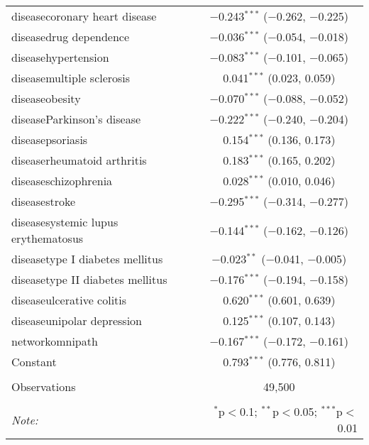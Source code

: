 \begin{table}[!htbp]
\begin{tabular}{@{\extracolsep{5pt}}lc}
  diseasecoronary heart disease & $-$0.243$^{***}$ ($-$0.262, $-$0.225) \\ 
  diseasedrug dependence & $-$0.036$^{***}$ ($-$0.054, $-$0.018) \\ 
  diseasehypertension & $-$0.083$^{***}$ ($-$0.101, $-$0.065) \\ 
  diseasemultiple sclerosis & 0.041$^{***}$ (0.023, 0.059) \\ 
  diseaseobesity & $-$0.070$^{***}$ ($-$0.088, $-$0.052) \\ 
  diseaseParkinson's disease & $-$0.222$^{***}$ ($-$0.240, $-$0.204) \\ 
  diseasepsoriasis & 0.154$^{***}$ (0.136, 0.173) \\ 
  diseaserheumatoid arthritis & 0.183$^{***}$ (0.165, 0.202) \\ 
  diseaseschizophrenia & 0.028$^{***}$ (0.010, 0.046) \\ 
  diseasestroke & $-$0.295$^{***}$ ($-$0.314, $-$0.277) \\ 
  diseasesystemic lupus erythematosus & $-$0.144$^{***}$ ($-$0.162, $-$0.126) \\ 
  diseasetype I diabetes mellitus & $-$0.023$^{**}$ ($-$0.041, $-$0.005) \\ 
  diseasetype II diabetes mellitus & $-$0.176$^{***}$ ($-$0.194, $-$0.158) \\ 
  diseaseulcerative colitis & 0.620$^{***}$ (0.601, 0.639) \\ 
  diseaseunipolar depression & 0.125$^{***}$ (0.107, 0.143) \\ 
  networkomnipath & $-$0.167$^{***}$ ($-$0.172, $-$0.161) \\ 
  Constant & 0.793$^{***}$ (0.776, 0.811) \\ 
 \hline \\[-1.8ex] 
Observations & 49,500 \\ 
\hline 
\hline \\[-1.8ex] 
\textit{Note:}  & \multicolumn{1}{r}{$^{*}$p$<$0.1; $^{**}$p$<$0.05; $^{***}$p$<$0.01} \\ 
\end{tabular} 
\end{table} 

